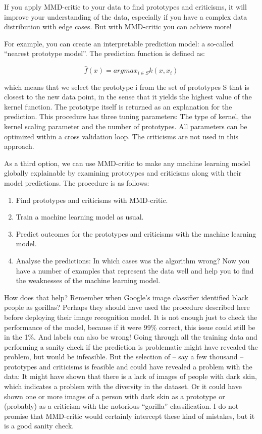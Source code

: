 \documentclass[12pt,]{krantz}
\providecommand{\tightlist}{%
  \setlength{\itemsep}{0pt}\setlength{\parskip}{0pt}}
\begin{document}
If you apply MMD-critic to your data to find prototypes and criticisms,
it will improve your understanding of the data, especially if you have a
complex data distribution with edge cases. But with MMD-critic you can
achieve more!

For example, you can create an interpretable prediction model: a
so-called ``nearest prototype model''. The prediction function is
defined as:

\[\hat{f}(x)=argmax_{i\in{}S}k(x,x_i)\]

which means that we select the prototype i from the set of prototypes S
that is closest to the new data point, in the sense that it yields the
highest value of the kernel function. The prototype itself is returned
as an explanation for the prediction. This procedure has three tuning
parameters: The type of kernel, the kernel scaling parameter and the
number of prototypes. All parameters can be optimized within a cross
validation loop. The criticisms are not used in this approach.

As a third option, we can use MMD-critic to make any machine learning
model globally explainable by examining prototypes and criticisms along
with their model predictions. The procedure is as follows:

\begin{enumerate}
\def\labelenumi{\arabic{enumi}.}
\tightlist
\item
  Find prototypes and criticisms with MMD-critic.
\item
  Train a machine learning model as usual.
\item
  Predict outcomes for the prototypes and criticisms with the machine
  learning model.
\item
  Analyse the predictions: In which cases was the algorithm wrong? Now
  you have a number of examples that represent the data well and help
  you to find the weaknesses of the machine learning model.
\end{enumerate}

How does that help? Remember when Google's image classifier identified
black people as gorillas? Perhaps they should have used the procedure
described here before deploying their image recognition model. It is not
enough just to check the performance of the model, because if it were
99\% correct, this issue could still be in the 1\%. And labels can also
be wrong! Going through all the training data and performing a sanity
check if the prediction is problematic might have revealed the problem,
but would be infeasible. But the selection of -- say a few thousand --
prototypes and criticisms is feasible and could have revealed a problem
with the data: It might have shown that there is a lack of images of
people with dark skin, which indicates a problem with the diversity in
the dataset. Or it could have shown one or more images of a person with
dark skin as a prototype or (probably) as a criticism with the notorious
``gorilla'' classification. I do not promise that MMD-critic would
certainly intercept these kind of mistakes, but it is a good sanity
check.
\end{document}
